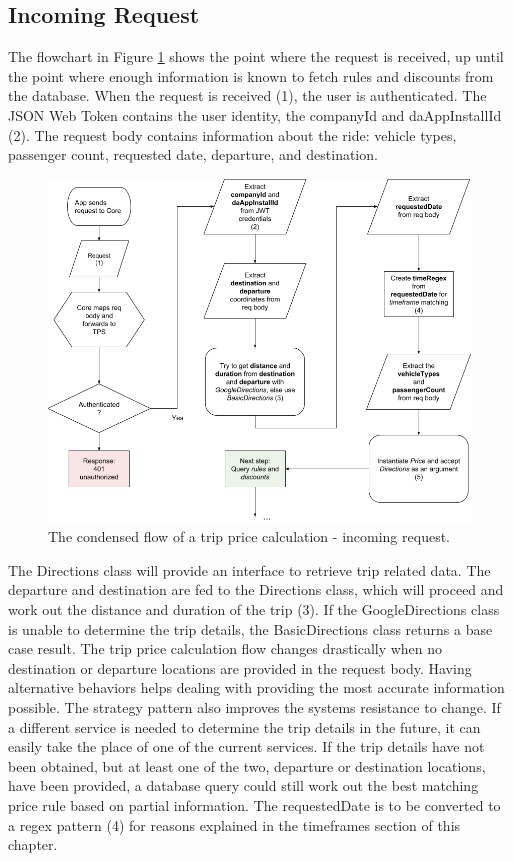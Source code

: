 \subsection{Incoming Request}
The flowchart in Figure \ref{fig:Incoming Request} shows the point where the request is received, up until the point where enough information is known to fetch rules and discounts from the database. When the request is received (1), the user is authenticated. The JSON Web Token contains the user identity, the companyId and daAppInstallId (2). The request body contains information about the ride: vehicle types, passenger count, requested date, departure, and destination.

\begin{figure}[H]
	\centering
	\includegraphics[width=1\textwidth]{IncomingRequest}
	\caption[Incoming Request]{The condensed flow of a trip price calculation - incoming request.}
	\label{fig:Incoming Request}
\end{figure}

The Directions class will provide an interface to retrieve trip related data. The departure and destination are fed to the Directions class, which will proceed and work out the distance and duration of the trip (3). If the GoogleDirections class is unable to determine the trip details, the BasicDirections class returns a base case result. The trip price calculation flow changes drastically when no destination or departure locations are provided in the request body. Having alternative behaviors helps dealing with providing the most accurate information possible. The strategy pattern also improves the systems resistance to change. If a different service is needed to determine the trip details in the future, it can easily take the place of one of the current services. If the trip details have not been obtained, but at least one of the two, departure or destination locations, have been provided, a database query could still work out the best matching price rule based on partial information. The requestedDate is to be converted to a regex pattern (4) for reasons explained in the timeframes section of this chapter.

